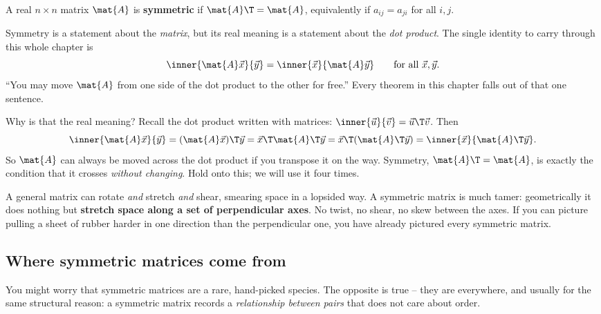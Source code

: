\begin{definition}
\label{ch26:def-symmetric}
A real $n\times n$ matrix $\mat{A}$ is \textbf{symmetric} if $\mat{A}\T = \mat{A}$,
equivalently if $a_{ij} = a_{ji}$ for all $i,j$.
\end{definition}

\begin{focusbox}
Symmetry is a statement about the \emph{matrix}, but its real meaning is a
statement about the \emph{dot product}. The single identity to carry through this
whole chapter is
\[
  \inner{\mat{A}\vec{x}}{\vec{y}} = \inner{\vec{x}}{\mat{A}\vec{y}}
  \qquad\text{for all } \vec{x},\vec{y}.
\]
``You may move $\mat{A}$ from one side of the dot product to the other for free.''
Every theorem in this chapter falls out of that one sentence.
\end{focusbox}

Why is that the real meaning? Recall the dot product written with matrices:
$\inner{\vec{u}}{\vec{v}} = \vec{u}\T\vec{v}$. Then
\[
  \inner{\mat{A}\vec{x}}{\vec{y}}
  = (\mat{A}\vec{x})\T\vec{y}
  = \vec{x}\T \mat{A}\T \vec{y}
  = \vec{x}\T(\mat{A}\T\vec{y})
  = \inner{\vec{x}}{\mat{A}\T\vec{y}}.
\]
So $\mat{A}$ can always be moved across the dot product if you transpose it on the
way. Symmetry, $\mat{A}\T=\mat{A}$, is exactly the condition that it crosses
\emph{without changing}. Hold onto this; we will use it four times.

\begin{intuitionbox}
A general matrix can rotate \emph{and} stretch \emph{and} shear, smearing space
in a lopsided way. A symmetric matrix is much tamer: geometrically it does
nothing but \textbf{stretch space along a set of perpendicular axes}. No twist,
no shear, no skew between the axes. If you can picture pulling a sheet of rubber
harder in one direction than the perpendicular one, you have already pictured
every symmetric matrix.
\end{intuitionbox}

\subsection{Where symmetric matrices come from}
\label{ch26:where-from}

You might worry that symmetric matrices are a rare, hand-picked species. The
opposite is true -- they are everywhere, and usually for the same structural
reason: a symmetric matrix records a \emph{relationship between pairs} that does
not care about order.

